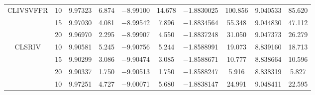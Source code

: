 \documentclass{style/presentation}
\begin{document}
\begin{frame}
\begin{table}[!htbp]
\begin{center}
\begin{tabular}{cccccccccc}
                \hline
                \multirow{3}{*}{CLIVSVFFR}                   & \num{10} & \num{9.97323}                       & \num{6.874}                            & \num{-8.99100}                      & \num{14.678}                           & \num{-1.8830025} & \num{100.856}                          & \num{9.040533}                      & \num{85.620}                           \\
                                                             & \num{15} & \num{9.97030}                       & \num{4.081}                            & \num{-8.99542}                      & \num{7.896}                            & \num{-1.8834564} & \num{55.348}                           & \num{9.044830}                      & \num{47.112}                           \\
                                                             & \num{20} & \num{9.96970}                       & \num{2.295}                            & \num{-8.99907}                      & \num{4.550}                            & \num{-1.8837248} & \num{31.050}                           & \num{9.047373}                      & \num{26.279}                           \\
                \hline
                \multirow{3}{*}{CLSRIV}                      & \num{10} & \num{9.90581}                       & \num{5.245}                            & \num{-9.90756}                      & \num{5.244}                            & \num{-1.8588991} & \num{19.073}                           & \num{8.839160}                      & \num{18.713}                           \\
                                                             & \num{15} & \num{9.90299}                       & \num{3.086}                            & \num{-9.90474}                      & \num{3.085}                            & \num{-1.8588671} & \num{10.777}                           & \num{8.838664}                      & \num{10.596}                           \\
                                                             & \num{20} & \num{9.90337}                       & \num{1.750}                            & \num{-9.90513}                      & \num{1.750}                            & \num{-1.8588247} & \num{5.916}                            & \num{8.838319}                      & \num{5.827}                            \\
                \hline
                \rowcolor{gray!50}                           & \num{10} & \num{9.97251}                       & \num{4.727}                            & \num{-9.00071}                      & \num{5.680}                            & \num{-1.8838147} & \num{24.991}                           & \num{9.048411}                      & \num{22.595}                           \\

\end{tabular}
\end{center}
\end{table}
\end{frame}
\end{document}
